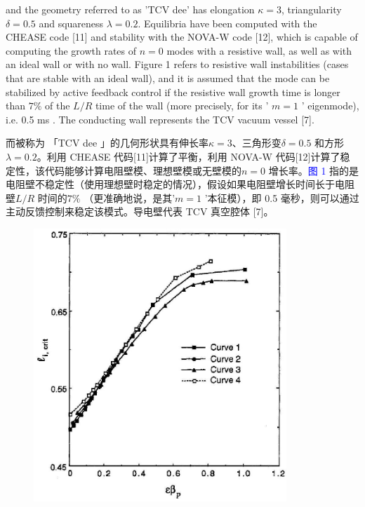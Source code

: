 \documentclass[utf8]{ctexart}
\newcommand\enzhbox[2]{
  	\quad\par \begin{paracol}{2} \colseprulecolor{black} 
  		\begin{spacing}{1.0}
  			\footnotesize  #1
  		\end{spacing}
  		\switchcolumn[1] 
  		#2
  	\end{paracol} \quad\par
  }
\begin{document}
\begin{sloppypar}
  
 
  
 
\enzhbox{  \noindent and the geometry referred to as 'TCV dee' has elongation $\kappa=3$, triangularity $\delta=0.5$ and squareness $\lambda=0.2$. Equilibria have been computed with the CHEASE code \textcolor{green!50!black}{[11]} and stability with the NOVA-W code \textcolor{green!50!black}{[12]}, which is capable of computing the growth rates of $n=0$ modes with a resistive wall, as well as with an ideal wall or with no wall. Figure 1 refers to resistive wall instabilities (cases that are stable with an ideal wall), and it is assumed that the mode can be stabilized by active feedback control if the resistive wall growth time is longer than $7 \%$ of the $L / R$ time of the wall (more precisely, for its ' $m=1$ ' eigenmode), i.e. 0.5 ms . The conducting wall represents the TCV vacuum vessel \textcolor{green!50!black}{[7]}.}{
\noindent 而被称为 「TCV dee 」的几何形状具有伸长率$\kappa=3$、三角形变$\delta=0.5$ 和方形$\lambda=0.2$。利用 CHEASE 代码\textcolor{green!50!black}{[11]}计算了平衡，利用 NOVA-W 代码\textcolor{green!50!black}{[12]}计算了稳定性，该代码能够计算电阻壁模、理想壁模或无壁模的$n=0$ 增长率。\textcolor{blue}{图 1} 指的是电阻壁不稳定性（使用理想壁时稳定的情况），假设如果电阻壁增长时间长于电阻壁$L / R$ 时间的$7 \%$ （更准确地说，是其'$m=1$ '本征模），即 0.5 毫秒，则可以通过主动反馈控制来稳定该模式。导电壁代表 TCV 真空腔体 \textcolor{green!50!black}{[7]}。}
  \begin{figure}[H]
  	\centering
  	\includegraphics[max width=0.85\textwidth,max height=0.3\textheight]{2025_01_10_a0135324997886412d98g-3}

\end{figure}
\end{sloppypar}
\end{document}
